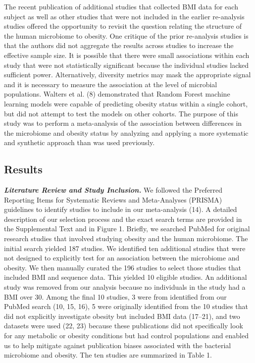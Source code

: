 \documentclass[12pt,]{article}
\begin{document}
The recent publication of additional studies that collected BMI data for
each subject as well as other studies that were not included in the
earlier re-analysis studies offered the opportunity to revisit the
question relating the structure of the human microbiome to obesity. One
critique of the prior re-analysis studies is that the authors did not
aggregate the results across studies to increase the effective sample
size. It is possible that there were small associations within each
study that were not statistically significant because the individual
studies lacked sufficient power. Alternatively, diversity metrics may
mask the appropriate signal and it is necessary to measure the
association at the level of microbial populations. Walters et al. (8)
demonstrated that Random Forest machine learning models were capable of
predicting obesity status within a single cohort, but did not attempt to
test the models on other cohorts. The purpose of this study was to
perform a meta-analysis of the association between differences in the
microbiome and obesity status by analyzing and applying a more
systematic and synthetic approach than was used previously.

\subsection{Results}\label{results}

\textbf{\emph{Literature Review and Study Inclusion.}} We followed the
Preferred Reporting Items for Systematic Reviews and Meta-Analyses
(PRISMA) guidelines to identify studies to include in our meta-analysis
(14). A detailed description of our selection process and the exact
search terms are provided in the Supplemental Text and in Figure 1.
Briefly, we searched PubMed for original research studies that involved
studying obesity and the human microbiome. The initial search yielded
187 studies. We identified ten additional studies that were not designed
to explicitly test for an association between the microbiome and
obesity. We then manually curated the 196 studies to select those
studies that included BMI and sequence data. This yielded 10 eligible
studies. An additional study was removed from our analysis because no
individuals in the study had a BMI over 30. Among the final 10 studies,
3 were from identified from our PubMed search (10, 15, 16), 5 were
originally identified from the 10 studies that did not explicitly
investigate obesity but included BMI data (17--21), and two datasets
were used (22, 23) because these publications did not specifically look
for any metabolic or obesity conditions but had control populations and
enabled us to help mitigate against publication biases associated with
the bacterial microbiome and obesity. The ten studies are summarized in
Table 1.
\end{document}
